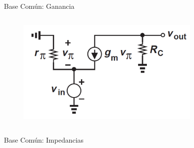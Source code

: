 \documentclass[t,aspectratio=169]{beamer}
\begin{document}
\begin{frame}{Base Común: Ganancia}
\begin{columns}
\begin{column}{0.5\textwidth}
\begin{figure}[H]
    \centering
    \includegraphics[width=0.8\textwidth]{figuras/base_comun_ganancia.png}
\end{figure}

\end{column}
\end{columns}
    
\end{frame}


\begin{frame}{Base Común: Impedancias}

\begin{columns}
\begin{column}{0.5\textwidth}
\end{column}
\begin{column}{0.5\textwidth}
\end{column}
\end{columns}
    
\end{frame}
\end{document}
